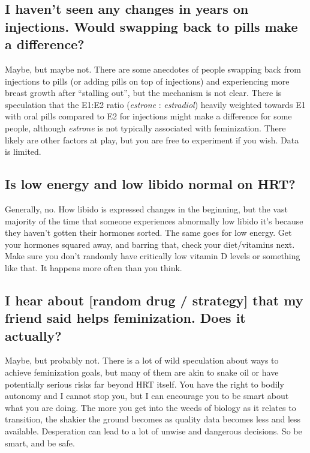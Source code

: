 \documentclass{article}
\begin{document}
\subsection{I haven’t seen any changes in years on injections. Would swapping back to pills make a difference?}

Maybe, but maybe not. There are some anecdotes of people swapping back from injections to pills (or adding pills on top of injections) and experiencing more breast growth after “stalling out”, but the mechanism is not clear. There is speculation that the E1:E2 ratio (\textit{estrone} : \textit{estradiol}) heavily weighted towards E1 with oral pills compared to E2 for injections might make a difference for some people, although \textit{estrone} is not typically associated with feminization. There likely are other factors at play, but you are free to experiment if you wish. Data is limited.

\subsection{Is low energy and low libido normal on HRT?}

Generally, no. How libido is expressed changes in the beginning, but the vast majority of the time that someone experiences abnormally low libido it’s because they haven’t gotten their hormones sorted. The same goes for low energy. Get your hormones squared away, and barring that, check your diet/vitamins next. Make sure you don’t randomly have critically low vitamin D levels or something like that. It happens more often than you think.

\subsection{I hear about [random drug / strategy] that my friend said helps feminization. Does it actually?}

Maybe, but probably not. There is a lot of wild speculation about ways to achieve feminization goals, but many of them are akin to snake oil or have potentially serious risks far beyond HRT itself. You have the right to bodily autonomy and I cannot stop you, but I can encourage you to be smart about what you are doing. The more you get into the weeds of biology as it relates to transition, the shakier the ground becomes as quality data becomes less and less available. Desperation can lead to a lot of unwise and dangerous decisions. So be smart, and be safe. 
\end{document}
